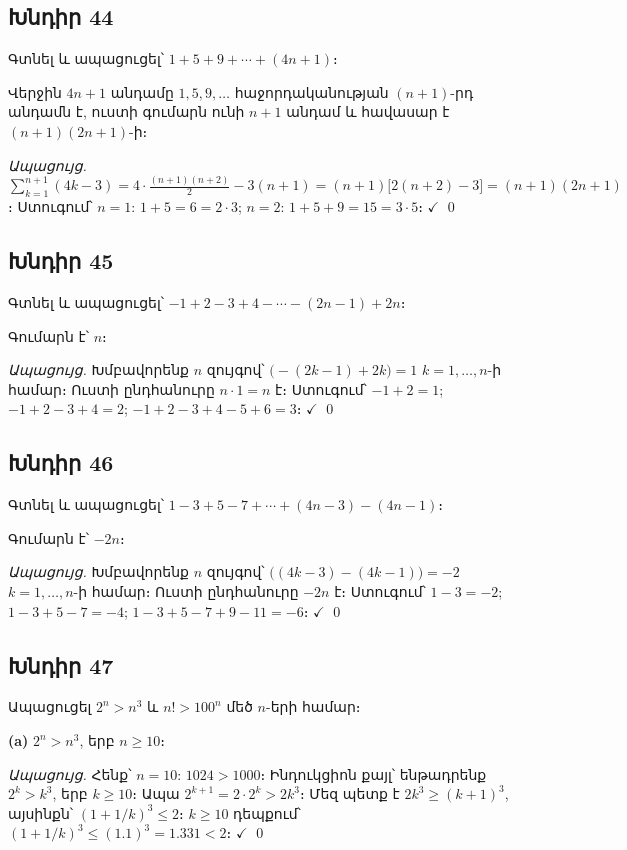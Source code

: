 \subsection*{Խնդիր 44}
Գտնել և ապացուցել՝ $1 + 5 + 9 + \cdots + (4n+1)$։

Վերջին $4n+1$ անդամը $1,5,9,\ldots$ հաջորդականության $(n+1)$-րդ անդամն է, ուստի գումարն ունի $n+1$ անդամ և հավասար է $\boxed{(n+1)(2n+1)}$-ի։

\textit{Ապացույց.} $\displaystyle\sum_{k=1}^{n+1}(4k-3) = 4\cdot\frac{(n+1)(n+2)}{2} - 3(n+1) = (n+1)\bigl[2(n+2)-3\bigr] = (n+1)(2n+1)$։
Ստուգում՝ $n=1$: $1+5 = 6 = 2\cdot 3$;\; $n=2$: $1+5+9 = 15 = 3\cdot 5$։ $\checkmark$ \qed

\subsection*{Խնդիր 45}
Գտնել և ապացուցել՝ $-1 + 2 - 3 + 4 - \cdots - (2n-1) + 2n$։

Գումարն է՝ $\boxed{n}$։

\textit{Ապացույց.} Խմբավորենք $n$ զույգով՝ $\bigl(-(2k-1) + 2k\bigr) = 1$ $k = 1, \ldots, n$-ի համար։ Ուստի ընդհանուրը $n \cdot 1 = n$ է։
Ստուգում՝ $-1+2 = 1$;\; $-1+2-3+4 = 2$;\; $-1+2-3+4-5+6 = 3$։ $\checkmark$ \qed

\subsection*{Խնդիր 46}
Գտնել և ապացուցել՝ $1 - 3 + 5 - 7 + \cdots + (4n-3) - (4n-1)$։

Գումարն է՝ $\boxed{-2n}$։

\textit{Ապացույց.} Խմբավորենք $n$ զույգով՝ $\bigl((4k-3) - (4k-1)\bigr) = -2$ $k = 1, \ldots, n$-ի համար։ Ուստի ընդհանուրը $-2n$ է։
Ստուգում՝ $1-3 = -2$;\; $1-3+5-7 = -4$;\; $1-3+5-7+9-11 = -6$։ $\checkmark$ \qed

\subsection*{Խնդիր 47}
Ապացուցել $2^n > n^3$ և $n! > 100^n$ մեծ $n$-երի համար։

\textbf{(a)} $2^n > n^3$, երբ $n \ge 10$։

\textit{Ապացույց.} Հենք՝ $n=10$: $1024 > 1000$։ Ինդուկցիոն քայլ՝ ենթադրենք $2^k > k^3$, երբ $k \ge 10$։ Ապա $2^{k+1} = 2 \cdot 2^k > 2k^3$։ Մեզ պետք է $2k^3 \ge (k+1)^3$, այսինքն՝ $(1+1/k)^3 \le 2$։ $k \ge 10$ դեպքում՝ $(1+1/k)^3 \le (1.1)^3 = 1.331 < 2$։ $\checkmark$ \qed

